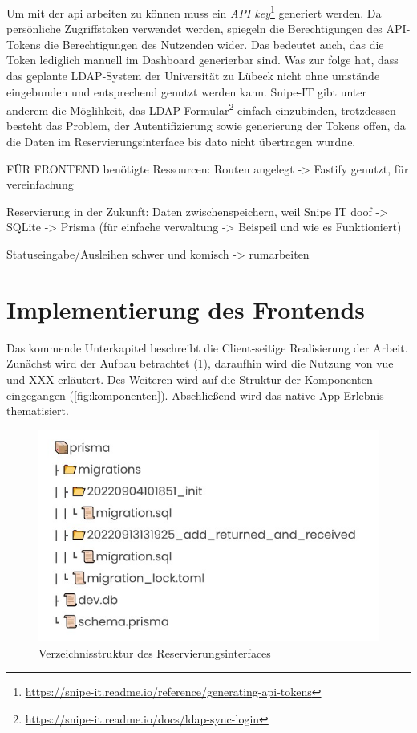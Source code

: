 Um mit der api arbeiten zu können muss ein \textit{API
  key}\footnote{\url{https://snipe-it.readme.io/reference/generating-api-tokens}}
  generiert werden. Da persönliche Zugriffstoken verwendet werden, spiegeln die
  Berechtigungen des API-Tokens die Berechtigungen des Nutzenden wider. Das
  bedeutet auch, das die Token lediglich manuell im Dashboard generierbar sind.
  Was zur folge hat, dass das geplante LDAP-System der Universität zu Lübeck
  nicht ohne umstände eingebunden und entsprechend genutzt werden kann. Snipe-IT
  gibt unter anderem die Möglihkeit, das LDAP
  Formular\footnote{\url{https://snipe-it.readme.io/docs/ldap-sync-login}}
  einfach einzubinden, trotzdessen besteht das Problem, der Autentifizierung
  sowie generierung der Tokens offen, da die Daten im Reservierungsinterface bis
  dato nicht übertragen wurdne.


FÜR FRONTEND benötigte Ressourcen: Routen angelegt -> Fastify genutzt, für
vereinfachung


Reservierung in der Zukunft: Daten zwischenspeichern, weil Snipe IT doof ->
SQLite -> Prisma (für einfache verwaltung -> Beispeil und wie es Funktioniert)


Statuseingabe/Ausleihen schwer und komisch -> rumarbeiten

\section{Implementierung des Frontends}
Das kommende Unterkapitel beschreibt die Client-seitige Realisierung der Arbeit. Zunächst wird der
Aufbau betrachtet (\ref{fig:vue}), daraufhin wird die Nutzung von vue und XXX erläutert. Des Weiteren wird auf die
Struktur der Komponenten eingegangen (\ref{fig:komponenten}). Abschließend wird das native App-Erlebnis thematisiert.

\begin{figure}[h]
  \centering
  \includegraphics[scale=0.7]{Bilder/Db.jpg}
  \caption[Verzeichnisstruktur des Reservierungsinterfaces]{Verzeichnisstruktur des Reservierungsinterfaces}
  \label{fig:vue}
\end{figure}

